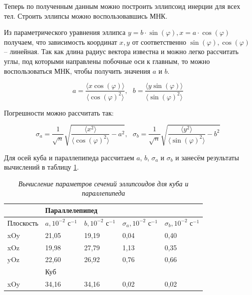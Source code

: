 \documentclass[a4paper,12pt]{article}
\begin{document}
Теперь по полученным данным можно построить эллипсоид инерции для всех тел. Строить эллипсы можно воспользовавшись МНК.

Из параметрического уравнения эллипса $y = b \cdot \sin(\varphi), x = a \cdot \cos(\varphi)$ получаем, что зависимость координат $x, y$ от соответственно $\sin(\varphi), \cos(\varphi)$ -- линейная. Так как длина радиус вектора известна и можно легко рассчитать углы, под которыми направлены побочные оси к главным, то можно воспользоваться МНК, чтобы получить значения $a$ и $b$.

\begin{equation}
    a = \frac{\langle x \cos(\varphi) \rangle}{\langle \cos(\varphi) ^ 2 \rangle}, \ \ \ b = \frac{\langle y \sin(\varphi) \rangle}{\langle \sin(\varphi) ^ 2 \rangle}
\end{equation}

Погрешности можно рассчитать так:

\begin{equation}
    \sigma_{a} = \frac{1}{\sqrt{n}}\sqrt{\frac{\langle x^2 \rangle}{\langle \cos(\varphi)^2 \rangle} - a^2}, \ \ \ \sigma_{b} = \frac{1}{\sqrt{n}}\sqrt{\frac{\langle y^2 \rangle}{\langle \sin(\varphi)^2 \rangle} - b^2}
\end{equation}

Для осей куба и параллепипеда рассчитаем $a$, $b$, $\sigma_{a}$ и $\sigma_{b}$ и занесём результаты вычислений в таблицу \ref{mnk-cp}.

\begin{table}[!ht]
    \centering
    \begin{tabular}{|l|l|l|l|l|}
    \hline
        ~ & \multicolumn{4}{l|}{Параллелепипед} \\ \hline
        Плоскость & $a, 10^{-2} \text{ с} ^{-1}$ & $b, 10^{-2} \text{ с} ^{-1}$ & $\sigma_{a}, 10^{-2} \text{ с} ^{-1}$ & $\sigma_{b}, 10^{-2} \text{ с} ^{-1}$ \\ \hline
        xOy & 21,05 & 19,19 & 0,04 & 0,40 \\ \hline
        xOz & 19,98 & 27,79 & 1,13 & 0,35 \\ \hline
        yOz & 22,60 & 26,92 & 0,76 & 0,66 \\ \hline
        ~ & \multicolumn{4}{l|}{Куб} \\ \hline
        xOy & 34,16 & 34,16 & 0,02 & 0,02 \\ \hline
    \end{tabular}\caption{\textit{Вычисление параметров сечений эллипсоидов для куба и параллепипеда}}\label{mnk-cp}
\end{table}
\end{document}
